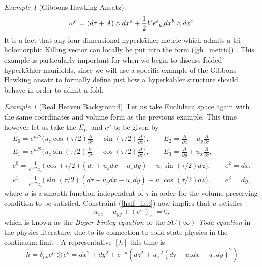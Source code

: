 \documentclass[a4paper,12pt, onecolumn, notitlepage]{article}
\theoremstyle{definition}
\theoremstyle{remark}
\newtheorem{ex}[thm]{Example}
\newcommand{\w}{\omega}
\newcommand{\m}{\mu}
\newcommand{\n}{\nu}
\newcommand{\e}{\epsilon}
\newcommand{\dd}[2]{\frac{\partial #1}{\partial #2}}
\newcommand{\HK}{hyperk\"ahler }
\begin{document}
\begin{ex}[Gibbons-Hawking Ansatz]
	\begin{equation}
	\label{gh_forms}
		\w\indices{^a} = (d\tau + A)\wedge dx\indices{^a} + \frac{1}{2}V\e\indices{^a_b_c}dx\indices{^b}\wedge dx\indices{^c}.
	\end{equation}
	It is a fact that any four-dimensional \HK metric which admits a tri-holomorphic Killing vector can locally be put into the form (\ref{gh_metric}) \cite{solitons}. This example is particularly important for when we begin to discuss folded \HK manifolds, since we will use a specific example of the Gibbons-Hawking ansatz to formally define just how a \HK structure should behave in order to admit a fold.\\
\end{ex}

\begin{ex}[Real Heaven Background]
	Let us take Euclidean space again with the same coordinates and volume form as the previous example. This time however let us take the $E\indices{_\m}$ and $e^{\m}$ to be given by
	\begin{gather*}
		E_{0} = e^{u/2}\bigg(u_{z}\cos(\tau/2)\dd{}{\tau} - \sin(\tau/2)\dd{}{z} \bigg),\qquad E_{2} = \dd{}{x} - u_{y}\dd{}{\tau}\\
		E_{1} = e^{u/2}\bigg(u_{z}\sin(\tau/2)\dd{}{\tau} + \cos(\tau/2)\dd{}{z} \bigg),\qquad E_{3} = \dd{}{y} + u_{x}\dd{}{\tau},\\
		e^{0} = \frac{1}{e^{u/2}u_{z}}\bigg(\cos(\tau/2)(d\tau + u_{y}dx - u_{x}dy) - u_{z}\sin(\tau/2)dz \bigg),\qquad e^{2}=dx,\\
		e^{1} = \frac{1}{e^{u/2}u_{z}}\bigg(\sin(\tau/2)(d\tau + u_{y}dx - u_{x}dy) + u_{z}\cos(\tau/2)dz \bigg),\qquad e^{3}=dy,
	\end{gather*}
	where $u$ is a smooth function independent of $\tau$ in order for the volume-preserving condition to be satisfied. Constraint (\ref{half_flat}) now implies that $u$ satisfies
	\begin{equation}
	\label{su_infty}
		u_{xx} + u_{yy} + (e^{u})_{zz} = 0,
	\end{equation}
	which is known as the \emph{Boyer-Finley equation} or the $SU(\infty)$\emph{-Toda equation} in the physics literature, due to its connection to solid state physics in the continuum limit \cite{tod_1995, lebrun_1991}. A representative $[h]$ this time is
	\begin{equation*}
		\hat{h} = \delta_{\m\n}e^{\m}\otimes e^{\n} = dx^{2}+dy^{2} + e^{-u}(dz^{2} + u_{z}^{-2}(d\tau + u_{y}dx - u_{x}dy)^{2})
	\end{equation*}

\end{ex}
\end{document}
